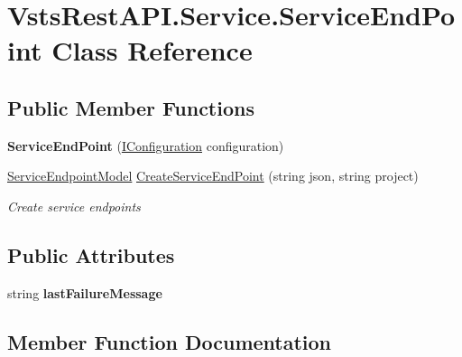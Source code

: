 \hypertarget{class_vsts_rest_a_p_i_1_1_service_1_1_service_end_point}{}\section{Vsts\+Rest\+A\+P\+I.\+Service.\+Service\+End\+Point Class Reference}
\label{class_vsts_rest_a_p_i_1_1_service_1_1_service_end_point}
\subsection*{Public Member Functions}
\begin{DoxyCompactItemize}
\item 
\mbox{\label{class_vsts_rest_a_p_i_1_1_service_1_1_service_end_point_adb7dd1bfe4949e2a7551809eeff98600}} 
{\bfseries Service\+End\+Point} (\mbox{\hyperlink{interface_vsts_rest_a_p_i_1_1_i_configuration}{I\+Configuration}} configuration)
\item 
\mbox{\hyperlink{class_vsts_rest_a_p_i_1_1_viewmodel_1_1_service_1_1_service_endpoint_model}{Service\+Endpoint\+Model}} \mbox{\hyperlink{class_vsts_rest_a_p_i_1_1_service_1_1_service_end_point_a6243f8d6d7cf88a7327d1f99acf974c5}{Create\+Service\+End\+Point}} (string json, string project)
\begin{DoxyCompactList}\small\item\em Create service endpoints \end{DoxyCompactList}\end{DoxyCompactItemize}
\subsection*{Public Attributes}
\begin{DoxyCompactItemize}
\item 
\mbox{\label{class_vsts_rest_a_p_i_1_1_service_1_1_service_end_point_a02dbf9151844c000fd955917c4c59c35}} 
string {\bfseries last\+Failure\+Message}
\end{DoxyCompactItemize}


\subsection{Member Function Documentation}
\mbox{\label{class_vsts_rest_a_p_i_1_1_service_1_1_service_end_point_a6243f8d6d7cf88a7327d1f99acf974c5}} 
